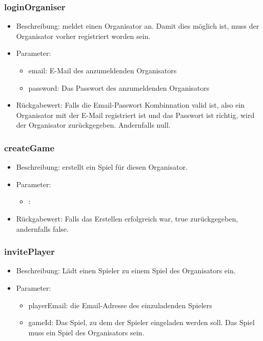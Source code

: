 \documentclass[a4paper]{scrreprt}
\begin{document}
	\subsubsection{loginOrganiser}
	\begin{itemize}
		\item Beschreibung: meldet einen Organisator an. Damit dies möglich ist, muss der Organisator vorher registriert worden sein.
		\item Parameter:
		\begin{itemize}
			\item email: E-Mail des anzumeldenden Organisators
			\item password: Das Passwort des anzumeldenden Organisators
		\end{itemize}
		\item Rückgabewert: Falls die Email-Passwort Kombinnation valid ist, also ein Organisator mit der E-Mail registriert ist und das Passwort ist richtig, wird der Organisator zurückgegeben. Andernfalls null.
	\end{itemize}
	\subsubsection{createGame}
	\begin{itemize}
		\item Beschreibung: erstellt ein Spiel für diesen Organisator.
		\item Parameter: %
		\begin{itemize}
			\item :
		\end{itemize}
		\item Rückgabewert: Falls das Erstellen erfolgreich war, true zurückgegeben, andernfalls false.
	\end{itemize}
	\subsubsection{invitePlayer}
	\begin{itemize}
		\item Beschreibung: Lädt einen Spieler zu einem Spiel des Organisators ein.
		\item Parameter:
		\begin{itemize}
			\item playerEmail: die Email-Adresse des einzuladenden Spielers
			\item gameId: Das Spiel, zu dem der Spieler eingeladen werden soll. Das Spiel muss ein Spiel des Organisators sein.
		\end{itemize}
	\end{itemize}
\end{document}

